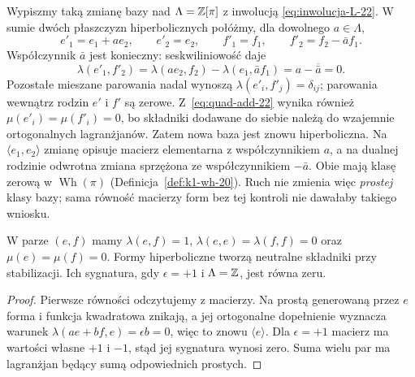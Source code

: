 Wypiszmy taką zmianę bazy nad
$\Lambda=\mathbb{Z}[\pi]$ z inwolucją
\eqref{eq:inwolucja-L-22}. W sumie dwóch
płaszczyzn hiperbolicznych połóżmy, dla
dowolnego $a\in\Lambda$,
\[
 e'_1=e_1+a e_2,\qquad e'_2=e_2,\qquad
 f'_1=f_1,\qquad f'_2=f_2-\bar a f_1.
\]
Współczynnik $\bar a$ jest konieczny:
seskwiliniowość daje
\[
 \lambda(e'_1,f'_2)
 =\lambda(ae_2,f_2)-\lambda(e_1,\bar a f_1)
 =a-\overline{\bar a}=0.
\]
Pozostałe mieszane parowania nadal wynoszą
$\lambda(e'_i,f'_j)=\delta_{ij}$; parowania
wewnątrz rodzin $e'$ i $f'$ są zerowe.
Z~\eqref{eq:quad-add-22} wynika również
$\mu(e'_i)=\mu(f'_i)=0$, bo składniki dodawane
do siebie należą do wzajemnie ortogonalnych
lagranżjanów. Zatem nowa baza jest znowu
hiperboliczna. Na $\langle e_1,e_2\rangle$
zmianę opisuje macierz elementarna z
współczynnikiem $a$, a na dualnej rodzinie
odwrotna zmiana sprzężona ze współczynnikiem
$-\bar a$. Obie mają klasę zerową w
$\operatorname{Wh}(\pi)$
(Definicja~\ref{def:k1-wh-20}). Ruch nie zmienia
więc \emph{prostej} klasy bazy; sama równość
macierzy form bez tej kontroli nie dawałaby
takiego wniosku.

\begin{stwierdzenie}
\label{prop:hiperboliczna-22}
W parze $(e,f)$ mamy $\lambda(e,f)=1$,
$\lambda(e,e)=\lambda(f,f)=0$ oraz
$\mu(e)=\mu(f)=0$. Formy hiperboliczne
tworzą neutralne składniki przy stabilizacji.
Ich sygnatura, gdy $\epsilon=+1$ i $\Lambda=\mathbb{Z}$,
jest równa zeru.
\end{stwierdzenie}
\begin{proof}
Pierwsze równości odczytujemy z macierzy.
Na prostą generowaną przez $e$ forma
i funkcja kwadratowa znikają, a jej
ortogonalne dopełnienie wyznacza warunek
$\lambda(ae+bf,e)=\epsilon b=0$, więc
to znowu $\langle e\rangle$.
Dla $\epsilon=+1$ macierz ma wartości własne
$+1$ i $-1$, stąd jej sygnatura wynosi zero.
Suma wielu par ma lagranżjan będący sumą
odpowiednich prostych.
\end{proof}

